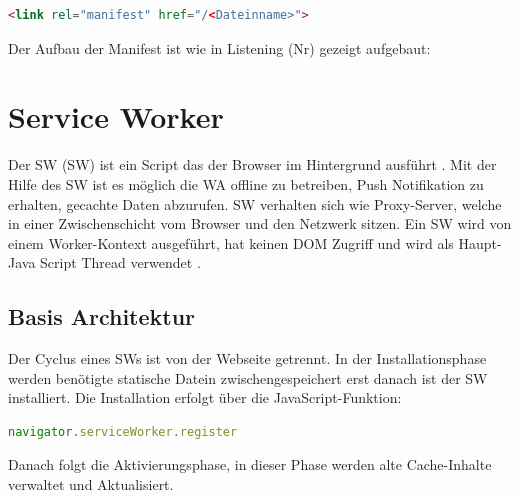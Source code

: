 \begin{lstlisting}[language=HTML, caption={Manifest.json},label=lst:Manifest.json, xleftmargin=50pt]
<link rel="manifest" href="/<Dateinname>">
\end{lstlisting}

Der Aufbau der Manifest ist wie in Listening (Nr) gezeigt aufgebaut:







\cite{Manifest}


\section{Service Worker}
Der \acl{SW} (\acs{SW}) ist ein Script das der Browser im Hintergrund ausführt \cite{RegistrierungServiceWorker}. Mit der Hilfe des \acs{SW} ist es möglich die \acs{WA} offline zu betreiben, Push Notifikation zu erhalten, gecachte Daten abzurufen. \acs{SW} verhalten sich wie Proxy-Server, welche in einer Zwischenschicht vom Browser und den Netzwerk sitzen. 
Ein \acs{SW} wird von einem Worker-Kontext \cite{Worker} ausgeführt, hat keinen DOM Zugriff und wird als Haupt-Java Script Thread verwendet \cite{ServiceWorker}.

\subsection{Basis Architektur}
Der Cyclus eines \acs{SW}s ist von der Webseite getrennt.
In der Installationsphase werden benötigte statische Datein zwischengespeichert erst danach ist der \acs{SW} installiert. Die Installation erfolgt über die JavaScript-Funktion:

\begin{lstlisting}[language=JavaScript, caption={Service Worker Navigator},label=lst:ServiceWorkerNavigator, xleftmargin=50pt]
navigator.serviceWorker.register
\end{lstlisting}

Danach folgt die Aktivierungsphase, in dieser Phase werden alte Cache-Inhalte verwaltet und Aktualisiert.


